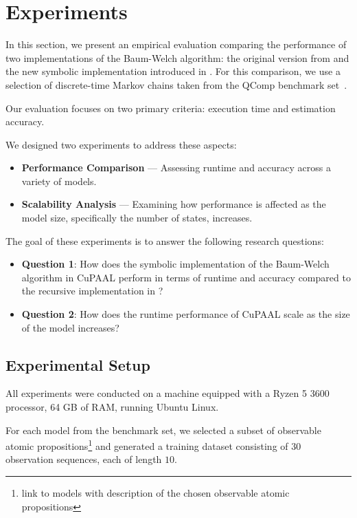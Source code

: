 \section{Experiments}\label{sec:experiments}
In this section, we present an empirical evaluation comparing the performance of two implementations of the Baum-Welch algorithm: the original version from \Jajapy and the new symbolic implementation introduced in \JajapyTwo.
For this comparison, we use a selection of discrete-time Markov chains taken from the QComp benchmark set~\cite{hartmanns2019quantitative}.

Our evaluation focuses on two primary criteria: execution time and estimation accuracy.

We designed two experiments to address these aspects:

\begin{itemize}
    \item \textbf{Performance Comparison} — Assessing runtime and accuracy across a variety of models.
    \item \textbf{Scalability Analysis} — Examining how performance is affected as the model size, specifically the number of states, increases.
\end{itemize}

The goal of these experiments is to answer the following research questions:

\begin{itemize}
    \item \textbf{Question 1}: How does the symbolic implementation of the Baum-Welch algorithm in CuPAAL perform in terms of runtime and accuracy compared to the recursive implementation in \Jajapy?
    \item \textbf{Question 2}: How does the runtime performance of CuPAAL scale as the size of the model increases?
\end{itemize}

\subsection{Experimental Setup}
All experiments were conducted on a machine equipped with a Ryzen 5 3600 processor, 64 GB of RAM, running Ubuntu Linux.

For each model from the benchmark set, we selected a subset of observable atomic propositions\footnote{{\color{red} link to models with description of the chosen observable atomic propositions}} and generated a training dataset consisting of $30$ observation sequences, each of length $10$.

